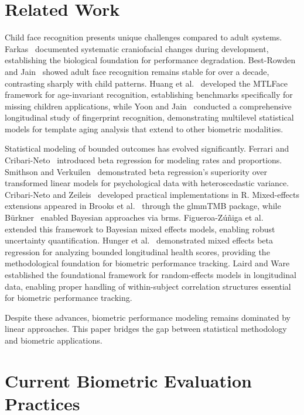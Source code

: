 \documentclass[10pt,journal,compsoc]{IEEEtran}
\begin{document}
\section{Related Work}
\label{sec:related_work}

Child face recognition presents unique challenges compared to adult systems. Farkas~\cite{farkas1994} documented systematic craniofacial changes during development, establishing the biological foundation for performance degradation. Best-Rowden and Jain~\cite{bestrowden2018} showed adult face recognition remains stable for over a decade, contrasting sharply with child patterns. Huang et al.~\cite{huang2023} developed the MTLFace framework for age-invariant recognition, establishing benchmarks specifically for missing children applications, while Yoon and Jain~\cite{yoon2015} conducted a comprehensive longitudinal study of fingerprint recognition, demonstrating multilevel statistical models for template aging analysis that extend to other biometric modalities.

Statistical modeling of bounded outcomes has evolved significantly. Ferrari and Cribari-Neto~\cite{ferrari2004} introduced beta regression for modeling rates and proportions. Smithson and Verkuilen~\cite{smithson2006} demonstrated beta regression's superiority over transformed linear models for psychological data with heteroscedastic variance. Cribari-Neto and Zeileis~\cite{cribari2010} developed practical implementations in R. Mixed-effects extensions appeared in Brooks et al.~\cite{brooks2017} through the glmmTMB package, while B\"urkner~\cite{burkner2017} enabled Bayesian approaches via brms. Figueroa-Zúñiga et al.~\cite{figueroa2013} extended this framework to Bayesian mixed effects models, enabling robust uncertainty quantification. Hunger et al.~\cite{hunger2012} demonstrated mixed effects beta regression for analyzing bounded longitudinal health scores, providing the methodological foundation for biometric performance tracking. Laird and Ware~\cite{laird1982} established the foundational framework for random-effects models in longitudinal data, enabling proper handling of within-subject correlation structures essential for biometric performance tracking.

Despite these advances, biometric performance modeling remains dominated by linear approaches. This paper bridges the gap between statistical methodology and biometric applications.

\section{Current Biometric Evaluation Practices}
\label{sec:current_practices}
\end{document}
